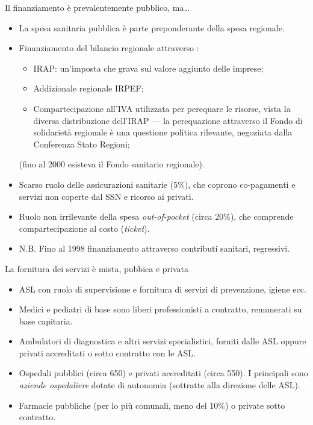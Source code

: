 \documentclass[aspectratio=64,12pt]{beamer}
\begin{document}
\begin{frame}{Il finanziamento è prevalentemente pubblico, ma\ldots{}}
\begin{itemize}
\item La spesa sanitaria pubblica è parte preponderante della spesa regionale.
\item Finanziamento del bilancio regionale attraverso :
\begin{itemize}
\item \alert{IRAP}: un'imposta che grava sul valore aggiunto delle imprese;
\item \alert{Addizionale regionale IRPEF};
\item \alert{Compartecipazione all'IVA} utilizzata per perequare le risorse, vista la
diversa distribuzione dell'IRAP --- la perequazione attraverso il Fondo di
solidarietà regionale è una questione politica rilevante, negoziata dalla
Conferenza Stato Regioni;
\end{itemize}
(fino al 2000 esisteva il Fondo sanitario regionale).
\item Scarso ruolo delle assicurazioni sanitarie (5\%), che coprono co-pagamenti e
servizi non coperte dal SSN e ricorso ai privati.
\item Ruolo non irrilevante della spesa \emph{out-of-pocket} (circa 20\%), che
comprende compartecipazione al costo (\emph{ticket}).
\item N.B. Fino al 1998 finanziamento attraverso contributi sanitari, regressivi.
\end{itemize}
\end{frame}

\begin{frame}{La fornitura dei servizi è mista, pubbica e privata}
\begin{itemize}
\item ASL con ruolo di supervisione e fornitura di servizi di prevenzione, igiene
ecc.
\item Medici e pediatri di base sono liberi professionisti a contratto,
remunerati su base capitaria.
\item Ambulatori di diagnostica e altri servizi specialistici, forniti dalle ASL
oppure privati accreditati o sotto contratto con le ASL.
\item Ospedali pubblici (circa 650) e privati accreditati (circa 550). I
principali sono \emph{aziende ospedaliere} dotate di autonomia (sottratte alla
direzione delle ASL).
\item Farmacie pubbliche (per lo più comunali, meno del 10\%) o private sotto
contratto.
\end{itemize}
\end{frame}
\end{document}

